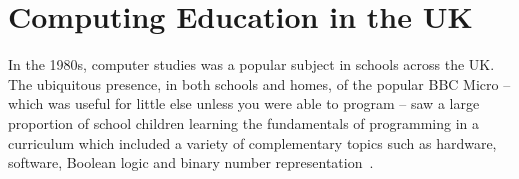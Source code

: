 \documentclass{sig-alternate}
\begin{document}

\section{Computing Education in the UK}\label{compedu}

In the 1980s, computer studies was a popular subject in schools across
the UK. The ubiquitous presence, in both schools and homes, of the
popular BBC Micro -- which was useful for little else unless you were
able to program -- saw a large proportion of school children learning
the fundamentals of programming in a curriculum which included a
variety of complementary topics such as hardware, software, Boolean
logic and binary number representation~\cite{Doyle:1988}.
\end{document}
